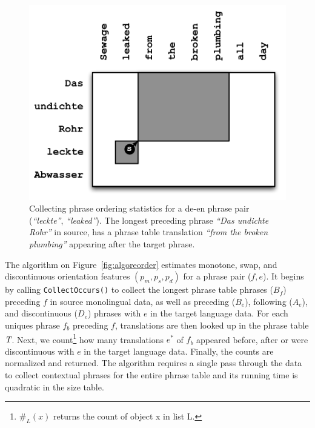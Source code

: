 \documentclass[11pt]{article}
\newcommand{\mnote}[1]{\marginpar{%
  \vskip-\baselineskip
  \raggedright\footnotesize
  \itshape\hrule\smallskip\tiny{#1}\par\smallskip\hrule}}
\newcommand{\mtodo}[1]{\mnote{\textcolor{red}{#1}}}
\newcommand{\figref}[1]{Figure~\ref{#1}}
\newcommand{\emq}[1]{\emph{``#1''}}
\begin{document}
\begin{figure}[t]
\begin{center}
\centerline{\includegraphics[width=\columnwidth]{../figures/monoreord/monoreord.pdf}}
\caption{Collecting phrase ordering statistics for a de-en phrase pair (\emq{leckte}, \emq{leaked}).  The longest preceding phrase \emq{Das undichte Rohr} in source, has a phrase table translation \emq{from the broken plumbing} appearing after the target phrase.}
\label{fig:monoreord}
\end{center}
\vskip -0.2in
\end{figure}

The algorithm on \figref{fig:algoreorder} estimates monotone, swap, and discontinuous orientation features $(p_m, p_s, p_d)$ for a phrase pair ($f, e$).  It begins by calling {\tt \small CollectOccurs()} to collect the longest phrase table phrases ($B_f$) preceding $f$ in source monolingual data, as well as preceding ($B_e$), following ($A_e$), and discontinuous ($D_e$) phrases with $e$ in the target language data.  For each uniques phrase $f_{b}$ preceding $f$, translations are then looked up in the phrase table $\emph{T}$.  Next, we count\footnote{$\#_{L}(x)$ returns the count of object x in list L.} how many translations $e^*$ of $f_b$ appeared before, after or were discontinuous with $e$ in the target language data.  Finally, the counts are normalized and returned. \mtodo{Be more specific about the out-of-order counts?}  The algorithm requires a single pass through the data to collect contextual phrases for the entire phrase table and its running time is quadratic in the size table.\mtodo{Check}
\end{document}
